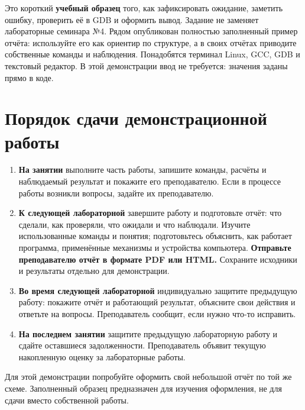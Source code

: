 Это короткий \textbf{учебный образец} того, как зафиксировать ожидание,
заметить ошибку, проверить её в GDB и оформить вывод. Задание не
заменяет лабораторные семинара №4. Рядом опубликован полностью
заполненный пример отчёта: используйте его как ориентир по структуре, а
в своих отчётах приводите собственные команды и наблюдения. Понадобятся
терминал Linux, GCC, GDB и текстовый редактор. В этой демонстрации ввод
не требуется: значения заданы прямо в коде.

\hypertarget{ux43fux43eux440ux44fux434ux43eux43a-ux441ux434ux430ux447ux438-ux434ux435ux43cux43eux43dux441ux442ux440ux430ux446ux438ux43eux43dux43dux43eux439-ux440ux430ux431ux43eux442ux44b}{%
\section{Порядок сдачи демонстрационной
работы}\label{ux43fux43eux440ux44fux434ux43eux43a-ux441ux434ux430ux447ux438-ux434ux435ux43cux43eux43dux441ux442ux440ux430ux446ux438ux43eux43dux43dux43eux439-ux440ux430ux431ux43eux442ux44b}}

\begin{enumerate}
\def\labelenumi{\arabic{enumi}.}
\tightlist
\item
  \textbf{На занятии} выполните часть работы, запишите команды, расчёты
  и наблюдаемый результат и покажите его преподавателю. Если в процессе
  работы возникли вопросы, задайте их преподавателю.
\item
  \textbf{К следующей лабораторной} завершите работу и подготовьте
  отчёт: что сделали, как проверяли, что ожидали и что наблюдали.
  Изучите использованные команды и понятия; подготовьтесь объяснить,
  как работает программа, применённые механизмы и устройства компьютера.
  \textbf{Отправьте преподавателю отчёт в формате PDF или HTML.}
  Сохраните исходники и результаты отдельно для демонстрации.
\item
  \textbf{Во время следующей лабораторной} индивидуально защитите
  предыдущую работу: покажите отчёт и работающий результат, объясните
  свои действия и ответьте на вопросы. Преподаватель сообщит, если нужно
  что-то исправить.
\item
  \textbf{На последнем занятии} защитите предыдущую лабораторную работу
  и сдайте оставшиеся задолженности. Преподаватель объявит текущую
  накопленную оценку за лабораторные работы.
\end{enumerate}

Для этой демонстрации попробуйте оформить свой небольшой отчёт по той же
схеме. Заполненный образец предназначен для изучения оформления, не для
сдачи вместо собственной работы.

